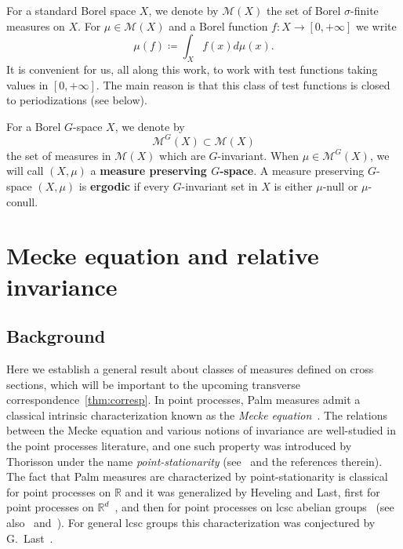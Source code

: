 \documentclass{amsart}
\numberwithin{equation}{subsection}
\theoremstyle{remark}
\begin{document}
For a standard Borel space \(X\), we denote by \(\mathcal{M}\left(X\right)\) the set of Borel \(\sigma\)-finite measures on \(X\). For \(\mu\in\mathcal{M}\left(X\right)\) and a Borel function \(f:X\to\left[0,+\infty\right]\) we write
\[\mu\left(f\right)\coloneqq \int_{X}f\left(x\right)d\mu\left(x\right).\]
It is convenient for us, all along this work, to work with test functions taking values in \(\left[0,+\infty\right]\). The main reason is that this class of test functions is closed to periodizations (see below).

For a Borel \(G\)-space \(X\), we denote by
\[\mathcal{M}^{G}\left(X\right)\subset\mathcal{M}\left(X\right)\]
the set of measures in \(\mathcal{M}\left(X\right)\) which are \(G\)-invariant. When \(\mu\in\mathcal{M}^{G}\left(X\right)\), we will call \(\left(X,\mu\right)\) a {\bf measure preserving \(G\)-space}. A measure preserving \(G\)-space \(\left(X,\mu\right)\) is {\bf ergodic} if every \(G\)-invariant set in \(X\) is either \(\mu\)-null or \(\mu\)-conull.

\section{Mecke equation and relative invariance}\label{sct:mecke}

\subsection{Background}

Here we establish a general result about classes of measures defined on cross sections, which will be important to the upcoming transverse correspondence~\ref{thm:corresp}. In point processes, Palm measures admit a classical intrinsic characterization known as the \emph{Mecke equation}~\cite{mecke1967}. The relations between the Mecke equation and various notions of invariance are well-studied in the point processes literature, and one such property was introduced by Thorisson under the name \emph{point-stationarity} (see~\cite{last2009} and the references therein). The fact that Palm measures are characterized by point-stationarity is classical for point processes on \(\mathbb{R}\) and it was generalized by Heveling and Last, first for point processes on \(\mathbb{R}^{d}\)~\cite[Theorem 4.1]{heveling2005}, and then for point processes on lcsc abelian groups~\cite{heveling2007} (see also~\cite[Theorem 3.44]{last2009} and~\cite[\S6]{baccelli2024}). For general lcsc groups this characterization was conjectured by G.~Last~\cite[\S3.10]{last2009}.
\end{document}
